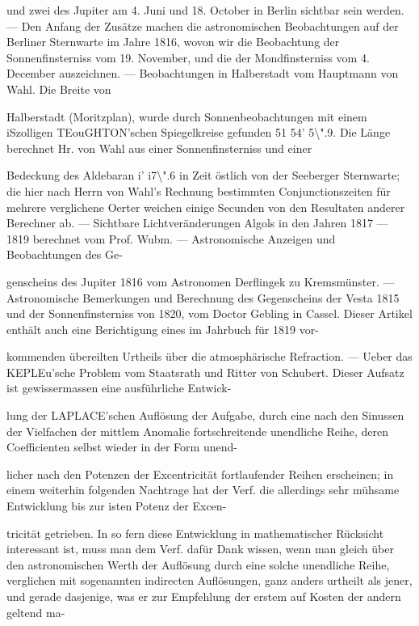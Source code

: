 \documentclass[10pt,a4paper]{article}
\begin{document}
und zwei des Jupiter am 4. Juni und 18. October in Berlin sichtbar sein werden. — Den Anfang der Zusätze machen die astronomischen Beobachtungen auf der Berliner Sternwarte im Jahre 1816, wovon wir die Beobachtung der Sonnenfinsterniss vom 19. November, und die der Mondfinsterniss vom 4. December auszeichnen. — Beobachtungen in Halberstadt vom Hauptmann von Wahl. Die Breite von

Halberstadt (Moritzplan), wurde durch Sonnenbeobachtungen mit einem iSzolligen TEouGHTON'schen Spiegelkreise gefunden 51\textdegree{} 54' 5\textbackslash{}".9. Die Länge berechnet Hr. von Wahl aus einer Sonnenfinsterniss und einer

Bedeckung des Aldebaran i' i7\textbackslash{}".6 in Zeit östlich von der Seeberger Sternwarte; die hier nach Herrn von Wahl's Rechnung bestimmten Conjunctionszeiten für mehrere verglichene Oerter weichen einige Secunden von den Resultaten anderer Berechner ab. — Sichtbare Lichtveränderungen Algols in den Jahren 1817 — 1819 berechnet vom Prof. Wubm. — Astronomische Anzeigen und Beobachtungen des Ge-

genscheins des Jupiter 1816 vom Astronomen Derflingek zu Kremsmünster. — Astronomische Bemerkungen und Berechnung des Gegenscheins der Vesta 1815 und der Sonnenfinsterniss von 1820, vom Doctor Gebling in Cassel. Dieser Artikel enthält auch eine Berichtigung eines im Jahrbuch für 1819 vor-

kommenden übereilten Urtheils über die atmosphärische Refraction. — Ueber das KEPLEu'sche Problem vom Staatsrath und Ritter von Schubert. Dieser Aufsatz ist gewissermassen eine ausführliche Entwick-

lung der LAPLACE'schen Auflösung der Aufgabe, durch eine nach den Sinussen der Vielfachen der mittlem Anomalie fortschreitende unendliche Reihe, deren Coefficienten selbst wieder in der Form unend-

licher nach den Potenzen der Excentricität fortlaufender Reihen erscheinen; in einem weiterhin folgenden Nachtrage hat der Verf. die allerdings sehr mühsame Entwicklung bis zur isten Potenz der Excen-

tricität getrieben. In so fern diese Entwicklung in mathematischer Rücksicht interessant ist, muss man dem Verf. dafür Dank wissen, wenn man gleich über den astronomischen Werth der Auflösung durch eine solche unendliche Reihe, verglichen mit sogenannten indirecten Auflösungen, ganz anders urtheilt als jener, und gerade dasjenige, was er zur Empfehlung der erstem auf Kosten der andern geltend ma-
\end{document}

